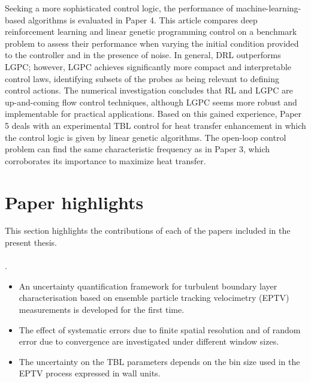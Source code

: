 Seeking a more sophisticated control logic, the performance of machine-learning-based algorithms is evaluated in Paper 4. This article compares deep reinforcement learning and linear genetic programming control on a benchmark problem to assess their performance when varying the initial condition provided to the controller and in the presence of noise. In general, DRL outperforms LGPC; however, LGPC achieves significantly more compact and interpretable control laws, identifying subsets of the probes as being relevant to defining control actions. The numerical investigation concludes that RL and LGPC are up-and-coming flow control techniques, although LGPC seems more robust and implementable for practical applications. Based on this gained experience, Paper 5 deals with an experimental TBL control for heat transfer enhancement in which the control logic is given by linear genetic algorithms. The open-loop control problem can find the same characteristic frequency as in Paper 3, which corroborates its importance to maximize heat transfer.

\section{Paper highlights}
This section highlights the contributions of each of the papers included in the present thesis.\\

 \\
.

\begin{itemize}
 \item An uncertainty quantification framework for turbulent boundary layer characterisation based on ensemble particle tracking velocimetry (EPTV) measurements is developed for the first time.
  \item The effect of systematic errors due to finite spatial resolution and of random error due to convergence are investigated under different window sizes.
  \item The uncertainty on the TBL parameters depends on the bin size used in the EPTV process expressed in wall units.
\end{itemize}
\vspace{.5cm}

